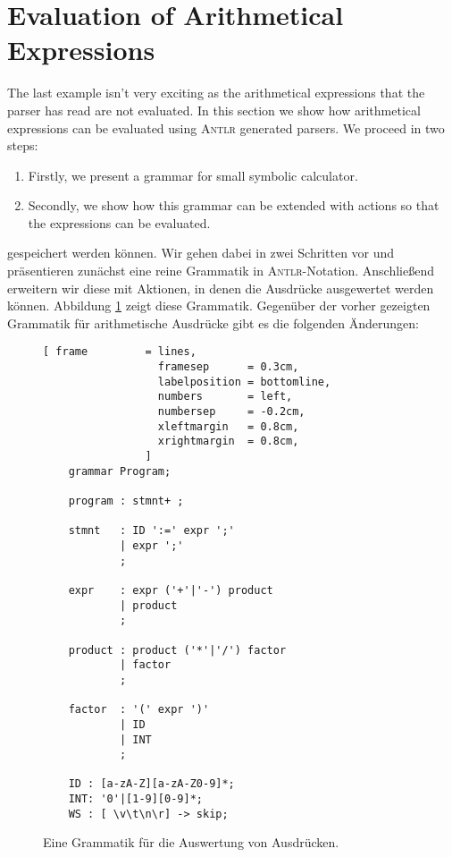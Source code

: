 \section{Evaluation of Arithmetical Expressions}
The last example isn't very exciting as the arithmetical expressions that the parser has read are not
evaluated.  In this section we show how arithmetical expressions can be evaluated using \textsc{Antlr}
generated parsers.  We proceed in two steps:
\begin{enumerate}
\item Firstly, we present a grammar for small symbolic calculator.
\item Secondly, we show how this grammar can be extended with actions so that the expressions can be evaluated.
\end{enumerate}

gespeichert werden k\"onnen.  Wir gehen dabei in zwei Schritten vor und pr\"asentieren
zun\"achst eine reine Grammatik in \textsc{Antlr}-Notation.  Anschlie{\ss}end erweitern wir diese
mit Aktionen, in denen die Ausdr\"ucke ausgewertet werden k\"onnen.
Abbildung \ref{fig:Program.g4} zeigt diese Grammatik.  Gegen\"uber der vorher gezeigten
Grammatik f\"ur arithmetische Ausdr\"ucke gibt es die folgenden \"Anderungen:

\begin{figure}[!ht]
\centering
\begin{Verbatim}[ frame         = lines, 
                  framesep      = 0.3cm, 
                  labelposition = bottomline,
                  numbers       = left,
                  numbersep     = -0.2cm,
                  xleftmargin   = 0.8cm,
                  xrightmargin  = 0.8cm,
                ]
    grammar Program;
    
    program : stmnt+ ;
    
    stmnt   : ID ':=' expr ';'
            | expr ';'
            ;    
    
    expr    : expr ('+'|'-') product
            | product
            ;
    
    product : product ('*'|'/') factor
            | factor
            ;
    
    factor  : '(' expr ')'
            | ID
            | INT
            ;
    
    ID : [a-zA-Z][a-zA-Z0-9]*;
    INT: '0'|[1-9][0-9]*;
    WS : [ \v\t\n\r] -> skip; 
\end{Verbatim}
\vspace*{-0.3cm}
\caption{Eine Grammatik f\"ur die Auswertung von Ausdr\"ucken.}
\label{fig:Program.g4}
\end{figure}


